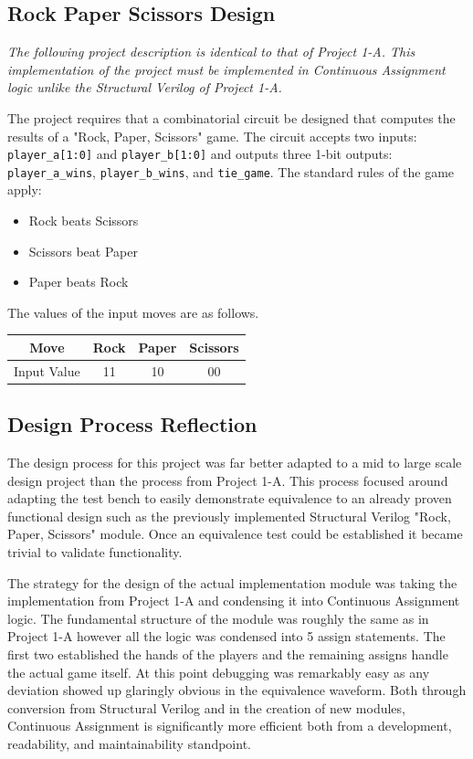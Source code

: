 \documentclass[12pt,letterpaper,titlepage]{article}
\begin{document}
\begin{raggedright}
\clearpage

\section{Rock Paper Scissors Design}
\textit{The following project description is identical to that of Project 1-A. This implementation of the project must be implemented in Continuous Assignment logic unlike the Structural Verilog of Project 1-A.}


The project requires that a combinatorial circuit be designed that computes the results of a "Rock, Paper, Scissors" game. The circuit accepts two inputs: \texttt{player\_a[1:0]} and \texttt{player\_b[1:0]} and outputs three 1-bit outputs: \texttt{player\_a\_wins}, \texttt{player\_b\_wins}, and \texttt{tie\_game}. The standard rules of the game apply: 
\begin{itemize}
\item Rock beats Scissors
\item Scissors beat Paper
\item Paper beats Rock
\end{itemize}

The values of the input moves are as follows.
\begin{center}
\begin{tabular}{|c|c|c|c|}
\hline 
Move & Rock & Paper & Scissors \\ 
\hline 
Input Value & 11 & 10 & 00 \\ 
\hline 
\end{tabular} 
\end{center}

\subsection*{Design Process Reflection}

The design process for this project was far better adapted to a mid to large scale design project than the process from Project 1-A. This process focused around adapting the test bench to easily demonstrate equivalence to an already proven functional design such as the previously implemented Structural Verilog "Rock, Paper, Scissors" module. Once an equivalence test could be established it became trivial to validate functionality.

The strategy for the design of the actual implementation module was taking the implementation from Project 1-A and condensing it into Continuous Assignment logic. The fundamental structure of the module was roughly the same as in Project 1-A however all the logic was condensed into 5 assign statements. The first two established the hands of the players and the remaining assigns handle the actual game itself. At this point debugging was remarkably easy as any deviation showed up glaringly obvious in the equivalence waveform. Both through conversion from Structural Verilog and in the creation of new modules, Continuous Assignment is significantly more efficient both from a development, readability, and maintainability standpoint.


\end{raggedright}
\end{document}
